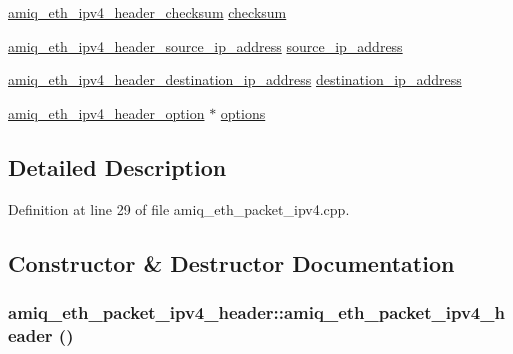 \begin{DoxyCompactItemize}
\item 
\hyperlink{amiq__eth__types_8cpp_aa96f7d0d833a00c7c37e0e777061f9a1}{amiq\_\-eth\_\-ipv4\_\-header\_\-checksum} \hyperlink{classamiq__eth__packet__ipv4__header_a115c8df31edf4ce462e76eccaa26cfeb}{checksum}
\item 
\hyperlink{amiq__eth__types_8cpp_a0755937539ec0776cc28378336460890}{amiq\_\-eth\_\-ipv4\_\-header\_\-source\_\-ip\_\-address} \hyperlink{classamiq__eth__packet__ipv4__header_aef58c0b2b3514612e8292c869230459d}{source\_\-ip\_\-address}
\item 
\hyperlink{amiq__eth__types_8cpp_adae60250f9312cab3a6b0e17c53bc95a}{amiq\_\-eth\_\-ipv4\_\-header\_\-destination\_\-ip\_\-address} \hyperlink{classamiq__eth__packet__ipv4__header_a28faea90dac453c655706af92d137ab1}{destination\_\-ip\_\-address}
\item 
\hyperlink{amiq__eth__types_8cpp_a794f90aa7884b3b371e18c6a4189ecf0}{amiq\_\-eth\_\-ipv4\_\-header\_\-option} $\ast$ \hyperlink{classamiq__eth__packet__ipv4__header_a9dbcfcbb3889c13241a1e66f6221d177}{options}
\end{DoxyCompactItemize}


\subsection{Detailed Description}


Definition at line 29 of file amiq\_\-eth\_\-packet\_\-ipv4.cpp.

\subsection{Constructor \& Destructor Documentation}
\hypertarget{classamiq__eth__packet__ipv4__header_aa149a70e2d1e46b5a676fdda303b86bb}{
\subsubsection[{amiq\_\-eth\_\-packet\_\-ipv4\_\-header}]{\setlength{\rightskip}{0pt plus 5cm}amiq\_\-eth\_\-packet\_\-ipv4\_\-header::amiq\_\-eth\_\-packet\_\-ipv4\_\-header ()}}
\label{classamiq__eth__packet__ipv4__header_aa149a70e2d1e46b5a676fdda303b86bb}


